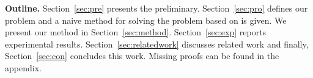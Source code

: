 \smallskip
\noindent
{\bf Outline.} Section~\ref{sec:pre} presents the preliminary. Section~\ref{sec:pro} defines our problem and a naive method for solving the problem based on \deepPoly is given. We present our method in Section~\ref{sec:method}. Section~\ref{sec:exp} reports experimental results. Section~\ref{sec:relatedwork} discusses related work and finally, Section~\ref{sec:con} concludes this work. 
Missing proofs can be found in the appendix.


